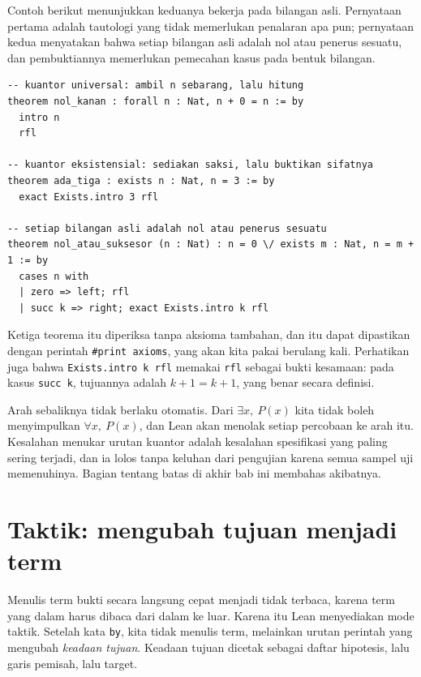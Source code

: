 Contoh berikut menunjukkan keduanya bekerja pada bilangan asli. Pernyataan pertama adalah
tautologi yang tidak memerlukan penalaran apa pun; pernyataan kedua menyatakan bahwa setiap
bilangan asli adalah nol atau penerus sesuatu, dan pembuktiannya memerlukan pemecahan kasus pada
bentuk bilangan.

\begin{verbatim}
-- kuantor universal: ambil n sebarang, lalu hitung
theorem nol_kanan : forall n : Nat, n + 0 = n := by
  intro n
  rfl

-- kuantor eksistensial: sediakan saksi, lalu buktikan sifatnya
theorem ada_tiga : exists n : Nat, n = 3 := by
  exact Exists.intro 3 rfl

-- setiap bilangan asli adalah nol atau penerus sesuatu
theorem nol_atau_suksesor (n : Nat) : n = 0 \/ exists m : Nat, n = m + 1 := by
  cases n with
  | zero => left; rfl
  | succ k => right; exact Exists.intro k rfl
\end{verbatim}

Ketiga teorema itu diperiksa tanpa aksioma tambahan, dan itu dapat dipastikan dengan perintah
\texttt{\#print axioms}, yang akan kita pakai berulang kali. Perhatikan juga bahwa
\texttt{Exists.intro k rfl} memakai \texttt{rfl} sebagai bukti kesamaan: pada kasus
\texttt{succ k}, tujuannya adalah $k+1=k+1$, yang benar secara definisi.

\begin{catatan}
Arah sebaliknya tidak berlaku otomatis. Dari $\exists x,\ P(x)$ kita tidak boleh menyimpulkan
$\forall x,\ P(x)$, dan Lean akan menolak setiap percobaan ke arah itu. Kesalahan menukar urutan
kuantor adalah kesalahan spesifikasi yang paling sering terjadi, dan ia lolos tanpa keluhan dari
pengujian karena semua sampel uji memenuhinya. Bagian tentang batas di akhir bab ini membahas
akibatnya.
\end{catatan}

\section{Taktik: mengubah tujuan menjadi term}


Menulis term bukti secara langsung cepat menjadi tidak terbaca, karena term yang dalam harus
dibaca dari dalam ke luar. Karena itu Lean menyediakan mode taktik. Setelah kata \texttt{by},
kita tidak menulis term, melainkan urutan perintah yang mengubah \emph{keadaan tujuan}. Keadaan
tujuan dicetak sebagai daftar hipotesis, lalu garis pemisah, lalu target.

